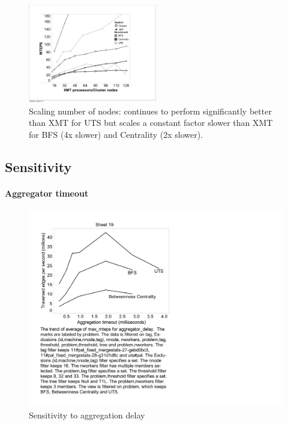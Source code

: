 {\begin{figure}[ht]
    \begin{center}
      \includegraphics[width=0.5\textwidth]{figs/scaling_cropped.pdf}
    \end{center}
    \caption{Scaling number of nodes: \Grappa continues to perform significantly better than XMT for UTS but scales a constant factor slower than XMT for BFS (4x slower) and Centrality (2x slower). }
    \label{fig:uts_threshold}
\end{figure}


\subsection{Sensitivity}

\paragraph{Aggregator timeout}

\begin{figure}[htb]
\begin{center}
  \includegraphics[width=0.95\columnwidth]{figs/flushticks_sweep}
\begin{minipage}{0.95\columnwidth}
  \caption{\label{fig:bfs-sweep-flushticks} Sensitivity to aggregation delay}
\end{minipage}
\vspace{-3ex}
\end{center}
\end{figure}


}

